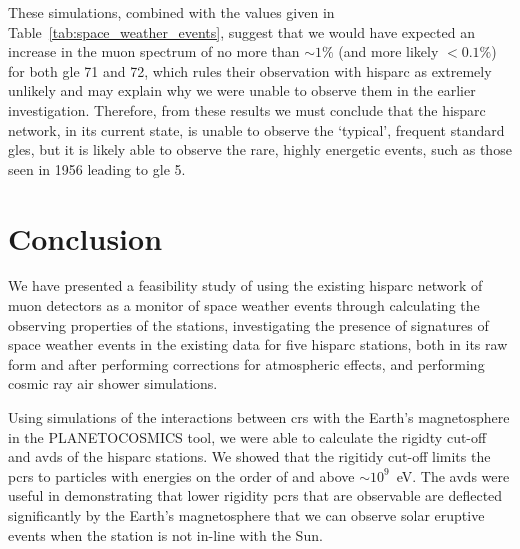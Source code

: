 These simulations, combined with the values given in Table~\ref{tab:space_weather_events}, suggest that we would have expected an increase in the muon spectrum of no more than $\sim 1\%$ (and more likely $< 0.1\%$) for both \gls{gle} 71 and 72, which rules their observation with \gls{hisparc} as extremely unlikely and may explain why we were unable to observe them in the earlier investigation. Therefore, from these results we must conclude that the \gls{hisparc} network, in its current state, is unable to observe the `typical', frequent standard \glspl{gle}, but it is likely able to observe the rare, highly energetic events, such as those seen in 1956 leading to \gls{gle} 5.



%




\section{Conclusion}\label{sec:HS_conclusion}

We have presented a feasibility study of using the existing \gls{hisparc} network of muon detectors as a monitor of space weather events through calculating the observing properties of the stations, investigating the presence of signatures of space weather events in the existing data for five \gls{hisparc} stations, both in its raw form and after performing corrections for atmospheric effects, and performing cosmic ray air shower simulations.

Using simulations of the interactions between \glspl{cr} with the Earth's magnetosphere in the PLANETOCOSMICS tool, we were able to calculate the rigidty cut-off and \glspl{avd} of the \gls{hisparc} stations. We showed that the rigitidy cut-off limits the \glspl{pcr} to particles with energies on the order of and above $\sim 10^9$~eV. The \glspl{avd} were useful in demonstrating that lower rigidity \glspl{pcr} that are observable are deflected significantly by the Earth's magnetosphere that we can observe solar eruptive events when the station is not in-line with the Sun.

